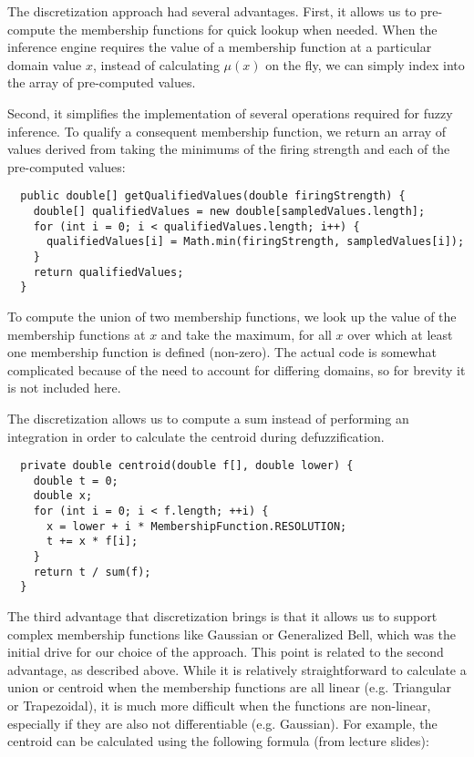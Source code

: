 \documentclass[12pt,letterpaper,oneside]{report}
\begin{document}
The discretization approach had several advantages. First, it allows us to
pre-compute the membership functions for quick lookup when needed. When the
inference engine requires the value of a membership function at a particular
domain value $x$, instead of calculating $ \mu(x) $ on the fly, we can simply
index into the array of pre-computed values. 

Second, it simplifies the implementation of several operations required for
fuzzy inference. To qualify a consequent membership function, we return an
array of values derived from taking the minimums of the firing strength and
each of the pre-computed values:

\footnotesize
\begin{verbatim}
  public double[] getQualifiedValues(double firingStrength) {
    double[] qualifiedValues = new double[sampledValues.length];
    for (int i = 0; i < qualifiedValues.length; i++) {
      qualifiedValues[i] = Math.min(firingStrength, sampledValues[i]);
    }
    return qualifiedValues;
  }
\end{verbatim}
\normalsize

To compute the union of two membership functions, we look up the value of the
membership functions at $x$ and take the maximum, for all $x$ over which at
least one membership function is defined (non-zero). The actual code is
somewhat complicated because of the need to account for differing domains, so
for brevity it is not included here.

The discretization allows us to compute a sum instead of performing an
integration in order to calculate the centroid during defuzzification.

\footnotesize
\begin{verbatim}
  private double centroid(double f[], double lower) {
    double t = 0;
    double x;
    for (int i = 0; i < f.length; ++i) {
      x = lower + i * MembershipFunction.RESOLUTION;
      t += x * f[i];
    }
    return t / sum(f);
  }
\end{verbatim}
\normalsize

The third advantage that discretization brings is that it allows us to support complex
membership functions like Gaussian or Generalized Bell, which was the initial
drive for our choice of the approach. This point is related to the second advantage,
as described above. While it is relatively straightforward to calculate a union
or centroid when the membership functions are all linear (e.g. Triangular or
Trapezoidal), it is much more difficult when the functions are non-linear,
especially if they are also not differentiable (e.g. Gaussian). For example,
the centroid can be calculated using the following formula (from lecture
slides):
\end{document}
